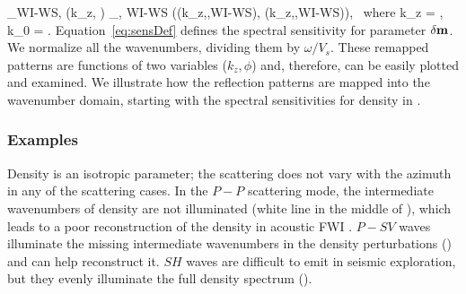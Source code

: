 \beq \label{eq:sensDef}
\Sp_{WI-WS,\delta \mv} (k_z, \varphi) \equiv \Dp_{\delta \mv, WI-WS} (\sv(k_z,\varphi,WI-WS), \gv(k_z,\varphi,WI-WS)),~
\eeq
where
\beq
k_z = ,~
k_{0} = . 
\eeq
Equation~\eqref{eq:sensDef} defines the spectral sensitivity for parameter 
$\delta \mathbf{m}$. We normalize all the wavenumbers, dividing them by $\omega/V_s$. %
These remapped patterns are functions of two variables ($k_z,\phi$) and, therefore, can be easily plotted and examined. We illustrate how the reflection patterns are mapped into the wavenumber domain, starting with the spectral sensitivities for density in . 

\subsubsection{Examples}
Density is an isotropic parameter; the scattering does not vary with the azimuth in any of the scattering cases. In the $P-P$ scattering mode, the intermediate wavenumbers of density are not illuminated (white line in the middle of ), which leads to a poor reconstruction of the density in acoustic FWI \citep{mulder2008}. $P-SV$ waves illuminate the missing intermediate wavenumbers in the density perturbations () and can help reconstruct it. $SH$ waves are difficult to emit in seismic exploration, but they evenly illuminate the full density spectrum ().

 
